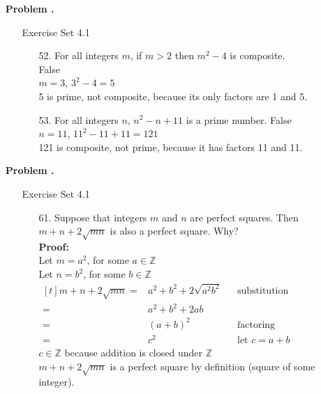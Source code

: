 \documentclass[letterpaper,fleqn]{article}
\begin{document}
	
	\begin{enumerate}
		\newcommand{\set}[1]{Exercise Set 4.#1}
		
		\setcounter{pcount}{1}
		
		\newcommand{\problem}[2]{	
		\item [] \textbf{Problem \thepcount\stepcounter{pcount}.}
		\begin{enumerate}
			\item [] Exercise Set 4.#1
			\begin{enumerate}
				#2
			\end{enumerate}
		\end{enumerate}
		}
		
		\problem{1}{
		\item [52.]
		For all integers $m$, if $m>2$ then $m^2-4$ is composite. \\
		False \\
		$m=3$, $3^2-4=5$ \\
		5 is prime, not composite, because its only factors are 1 and 5.
		
		\item [53.]
		For all integers $n$, $n^2-n+11$ is a prime number.
		False \\
		$n=11$, $11^2-11+11=121$ \\
		121 is composite, not prime, because it has factors 11 and 11.
		}
		
		\problem{1}{
		\item [61.]
		Suppose that integers $m$ and $n$ are perfect squares. Then $m+n+2\sqrt{mn}$ is also a perfect square. Why? \\
		\textbf{Proof:} \\
		Let $m=a^2$, for some $a \in \mathbb{Z}$ \\
		Let $n=b^2$, for some $b \in \mathbb{Z}$ \\
		$\begin{aligned}[t]
			m+n+2\sqrt{mn} ={} & a^2+b^2+2\sqrt{a^2b^2}  && \text{substitution} \\
			={} & a^2+b^2+2ab \\
			={} & (a+b)^2 && \text{factoring} \\
			={} & c^2 && \text{let $c=a+b$}
		\end{aligned}$ \\
		$c \in \mathbb{Z}$ because addition is closed under $\mathbb{Z}$ \\
		$m+n+2\sqrt{mn}$ is a perfect square by definition (square of some integer).
		}
		

\end{enumerate}
\end{document}
